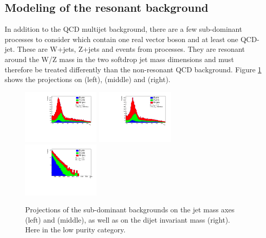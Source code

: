 \clearpage

\subsection{Modeling of the resonant background}
\label{sec:resbkgd}
In addition to the QCD multijet background, there are a few sub-dominant processes to consider which contain one real vector boson and at least one QCD-jet. These are W+jets, Z+jets and events from \ttbar processes. They are resonant around the W/Z mass in the two softdrop jet mass dimensions and must therefore be treated differently than the non-resonant QCD background. Figure \ref{fig:stack_res_bkg} shows the projections on \MJO (left), \MJT (middle) and \MVV (right).
\begin{figure}[h!]
 \includegraphics[width=0.329\textwidth]{figures/analysis/search3/AN-17-303/resonantBkg/CP_background_px_xrange55-215_yrange55-215zrange1126-5000_HPLP.pdf}
 \includegraphics[width=0.329\textwidth]{figures/analysis/search3/AN-17-303/resonantBkg/CP_background_py_xrange55-215_yrange55-215zrange1126-5000_HPLP.pdf}
 \includegraphics[width=0.329\textwidth]{figures/analysis/search3/AN-17-303/resonantBkg/CP_background_pz_xrange55-215_yrange55-215zrange1126-5000_HPLP.pdf}
\caption{Projections of the sub-dominant backgrounds on the jet mass axes \MJO (left) and \MJT (middle), as well as on the dijet invariant mass \MVV (right). Here in the low purity category.}
\label{fig:stack_res_bkg}
\end{figure}
